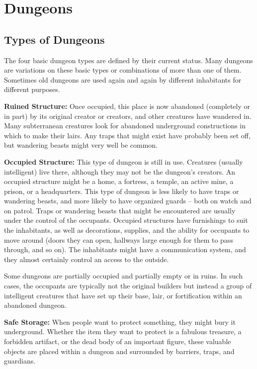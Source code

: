\section{Dungeons}

\subsection{Types of Dungeons}

The four basic dungeon types are defined by their current status. Many dungeons are variations on these basic types or combinations of more than one of them. Sometimes old dungeons are used again and again by different inhabitants for different purposes.

\textbf{Ruined Structure:} Once occupied, this place is now abandoned (completely or in part) by its original creator or creators, and other creatures have wandered in. Many subterranean creatures look for abandoned underground constructions in which to make their lairs. Any traps that might exist have probably been set off, but wandering beasts might very well be common.

\textbf{Occupied Structure:} This type of dungeon is still in use. Creatures (usually intelligent) live there, although they may not be the dungeon's creators. An occupied structure might be a home, a fortress, a temple, an active mine, a prison, or a headquarters. This type of dungeon is less likely to have traps or wandering beasts, and more likely to have organized guards -- both on watch and on patrol. Traps or wandering beasts that might be encountered are usually under the control of the occupants. Occupied structures have furnishings to suit the inhabitants, as well as decorations, supplies, and the ability for occupants to move around (doors they can open, hallways large enough for them to pass through, and so on). The inhabitants might have a communication system, and they almost certainly control an access to the outside.

Some dungeons are partially occupied and partially empty or in ruins. In such cases, the occupants are typically not the original builders but instead a group of intelligent creatures that have set up their base, lair, or fortification within an abandoned dungeon.

\textbf{Safe Storage:} When people want to protect something, they might bury it underground. Whether the item they want to protect is a fabulous treasure, a forbidden artifact, or the dead body of an important figure, these valuable objects are placed within a dungeon and surrounded by barriers, traps, and guardians.

